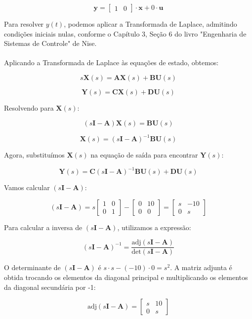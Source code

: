\documentclass[a4paper,11pt]{article}
\begin{document}
$$
\textbf{y} = \begin{bmatrix} 1 & 0 \end{bmatrix} \cdot \textbf{x} + 0 \cdot \textbf{u}
$$

Para resolver $y(t)$, podemos aplicar a Transformada de Laplace, admitindo condições iniciais nulas, conforme o Capítulo 3, Seção 6 do livro "Engenharia de Sistemas de Controle" de Nise.
\\\\
Aplicando a Transformada de Laplace às equações de estado, obtemos:

$$
s\textbf{X}(s) = \textbf{AX}(s) + \textbf{BU}(s)
$$

$$
\textbf{Y}(s) = \textbf{CX}(s) + \textbf{DU}(s)
$$

Resolvendo para $\textbf{X}(s)$:

$$
(s\textbf{I} - \textbf{A})\textbf{X}(s) = \textbf{BU}(s)
$$

$$
\textbf{X}(s) = (s\textbf{I} - \textbf{A})^{-1}\textbf{BU}(s)
$$

Agora, substituímos $\textbf{X}(s)$ na equação de saída para encontrar $\textbf{Y}(s)$:

$$
\textbf{Y}(s) = \textbf{C}(s\textbf{I} - \textbf{A})^{-1}\textbf{BU}(s) + \textbf{DU}(s)
$$

Vamos calcular $(s\textbf{I} - \textbf{A})$:

$$
(s\textbf{I} - \textbf{A}) = s\begin{bmatrix} 1 & 0 \\ 0 & 1 \end{bmatrix} - \begin{bmatrix} 0 & 10 \\ 0 & 0 \end{bmatrix} = \begin{bmatrix} s & -10 \\ 0 & s \end{bmatrix}
$$

Para calcular a inversa de $(s\textbf{I} - \textbf{A})$, utilizamos a expressão:

$$
(s\textbf{I} - \textbf{A})^{-1} = \frac{\text{adj}(s\textbf{I} - \textbf{A})}{\text{det}(s\textbf{I} - \textbf{A})}
$$

O determinante de $(s\textbf{I} - \textbf{A})$ é $s \cdot s - (-10) \cdot 0 = s^2$. A matriz adjunta é obtida trocando os elementos da diagonal principal e multiplicando os elementos da diagonal secundária por -1:

$$
\text{adj}(s\textbf{I} - \textbf{A}) = \begin{bmatrix} s & 10 \\ 0 & s \end{bmatrix}
$$
\end{document}
